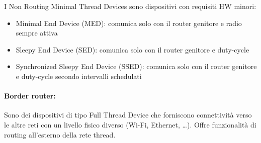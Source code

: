 \newpage

I Non Routing Minimal Thread Devices sono dispositivi con requisiti HW minori:
\begin{itemize}
	\item Minimal End Device (MED): comunica solo con il router genitore e radio sempre attiva
	\item Sleepy End Device (SED): comunica solo con il router genitore e duty-cycle
	\item Synchronized Sleepy End Device (SSED): comunica solo con il router genitore e duty-cycle secondo intervalli schedulati
\end{itemize}

\paragraph{Border router:} Sono dei dispositivi di tipo Full Thread Device che forniscono connettività verso le altre reti con un livello fisico diverso (Wi-Fi, Ethernet, \dots). Offre funzionalità di routing all'esterno della rete thread.\\


